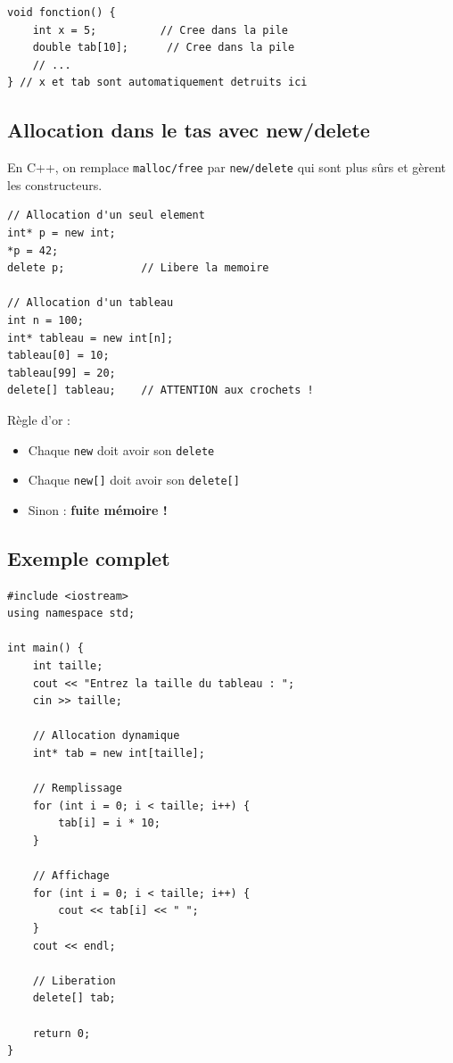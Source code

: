 \documentclass[12pt,a4paper]{article}
\begin{document}
\begin{lstlisting}[style=cpp, caption={Variables locales dans la pile}]
void fonction() {
    int x = 5;          // Cree dans la pile
    double tab[10];      // Cree dans la pile
    // ...
} // x et tab sont automatiquement detruits ici
\end{lstlisting}

\subsection{Allocation dans le tas avec new/delete}

En C++, on remplace \texttt{malloc/free} par \texttt{new/delete} qui sont plus sûrs et gèrent les constructeurs.

\begin{lstlisting}[style=cpp, caption={Allocation dynamique avec new}]
// Allocation d'un seul element
int* p = new int;
*p = 42;
delete p;            // Libere la memoire

// Allocation d'un tableau
int n = 100;
int* tableau = new int[n];
tableau[0] = 10;
tableau[99] = 20;
delete[] tableau;    // ATTENTION aux crochets !
\end{lstlisting}

\begin{important}
Règle d'or :
\begin{itemize}
    \item Chaque \texttt{new} doit avoir son \texttt{delete}
    \item Chaque \texttt{new[]} doit avoir son \texttt{delete[]}
    \item Sinon : \textbf{fuite mémoire !}
\end{itemize}
\end{important}

\subsection{Exemple complet}

\begin{lstlisting}[style=cpp, caption={Gestion dynamique d'un tableau}]
#include <iostream>
using namespace std;

int main() {
    int taille;
    cout << "Entrez la taille du tableau : ";
    cin >> taille;

    // Allocation dynamique
    int* tab = new int[taille];

    // Remplissage
    for (int i = 0; i < taille; i++) {
        tab[i] = i * 10;
    }

    // Affichage
    for (int i = 0; i < taille; i++) {
        cout << tab[i] << " ";
    }
    cout << endl;

    // Liberation
    delete[] tab;

    return 0;
}
\end{lstlisting}
\end{document}
